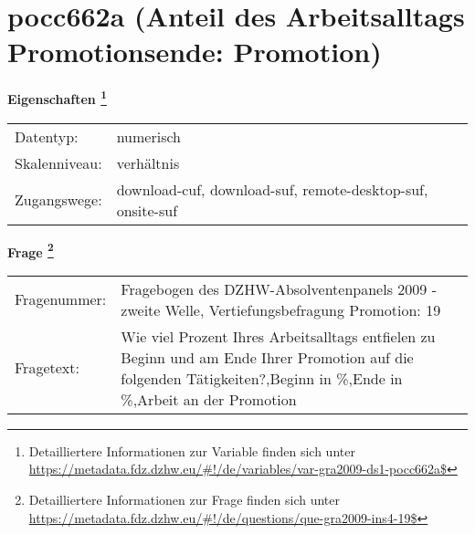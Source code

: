 
    \setcounter{footnote}{0}

    \vspace*{-1.8cm}
	\section{pocc662a (Anteil des Arbeitsalltags Promotionsende: Promotion)}
	\label{section:pocc662a}



    \vspace*{0.5cm}
    \noindent\textbf{Eigenschaften
	\footnote{Detailliertere Informationen zur Variable finden sich unter
		\url{https://metadata.fdz.dzhw.eu/\#!/de/variables/var-gra2009-ds1-pocc662a$}}}\\
	\begin{tabularx}{\hsize}{@{}lX}
	Datentyp: & numerisch \\
	Skalenniveau: & verhältnis \\
	Zugangswege: &
	  download-cuf, 
	  download-suf, 
	  remote-desktop-suf, 
	  onsite-suf
 \\
    \end{tabularx}



				\vspace*{0.5cm}
                \noindent\textbf{Frage
	                \footnote{Detailliertere Informationen zur Frage finden sich unter
		              \url{https://metadata.fdz.dzhw.eu/\#!/de/questions/que-gra2009-ins4-19$}}}\\
				\begin{tabularx}{\hsize}{@{}lX}
					Fragenummer: &
					  Fragebogen des DZHW-Absolventenpanels 2009 - zweite Welle, Vertiefungsbefragung Promotion:
					  19
 \\
					Fragetext: & Wie viel Prozent Ihres Arbeitsalltags entfielen zu Beginn und am Ende Ihrer Promotion auf die folgenden Tätigkeiten?,Beginn in \%,Ende in \%,Arbeit an der Promotion \\
				\end{tabularx}





